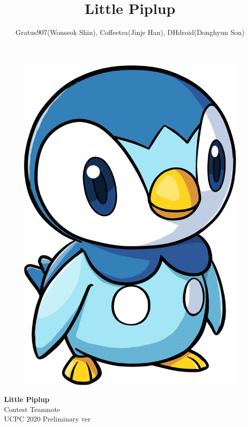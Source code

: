 \documentclass[landscape,8pt]{article}
\title{\Huge{\textsf{Little Piplup}}}
\author{Gratus907(Wonseok Shin), Coffeetea(Jinje Han), DHdroid(Donghyun Son)}
\date{ }
\begin{document}
{
  \vspace*{0.5in}
  \setlength{\columnseprule}{0pt}
  \begin{multicols}{3}\raggedcolumns
  \vspace*{\fill}
  \begin{figure}[H]
  \includegraphics[width=\linewidth]{piplup}
  \end{figure}
  \vspace*{\fill}
  \columnbreak
  \begin{center}
  \vspace*{\fill}
  \huge{\textbf{Little Piplup}\\}
  \vspace{2em}
    \LARGE{Contest Teamnote \\}
   \large{UCPC 2020 Preliminary ver}
  \vspace*{\fill}
  \end{center}
  \columnbreak


\end{multicols}}
\end{document}
